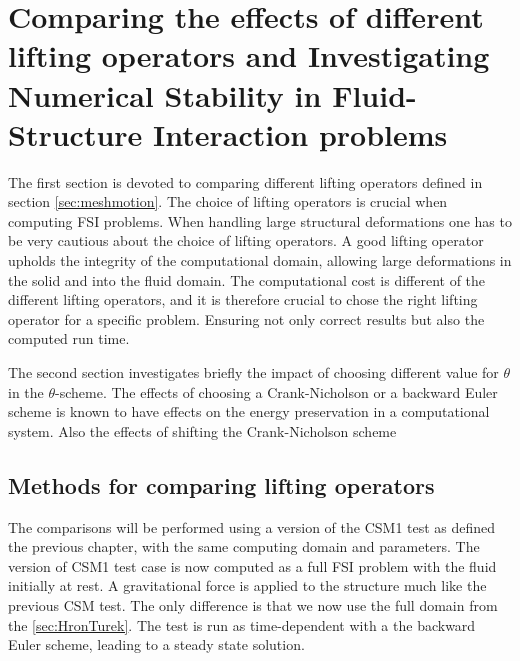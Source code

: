 \chapter{Comparing the effects of different lifting operators and Investigating Numerical Stability in Fluid-Structure Interaction problems}\label{sec:mesh_motion}
The first section is devoted to comparing different lifting operators defined in section \ref{sec:meshmotion}. The choice of lifting operators is crucial when computing FSI problems. When handling large structural deformations one has to be very cautious about the choice of lifting operators. A good lifting operator upholds the integrity of the computational domain, allowing large deformations in the solid and into the fluid domain. The computational cost is different of the different lifting operators, and it is therefore crucial to chose the right lifting operator for a specific problem. Ensuring not only correct results but also the computed run time.

The second section investigates briefly the impact of choosing different value for $\theta$ in the $\theta$-scheme. The effects of choosing a Crank-Nicholson or a backward Euler scheme is known to have effects on the energy preservation in a computational system. Also the effects of shifting the Crank-Nicholson scheme  \newline

\section{Methods for comparing lifting operators}
The comparisons will be performed using a version of the CSM1 test as defined the previous chapter, with the same computing domain and parameters. The version of CSM1 test case is now computed as a full FSI problem with the fluid initially at rest. A gravitational force is applied to the structure much like the previous CSM test. The only difference is that we now use the full domain from the \ref{sec:HronTurek}. The test is run as time-dependent with a the backward Euler scheme, leading to a steady state solution.

